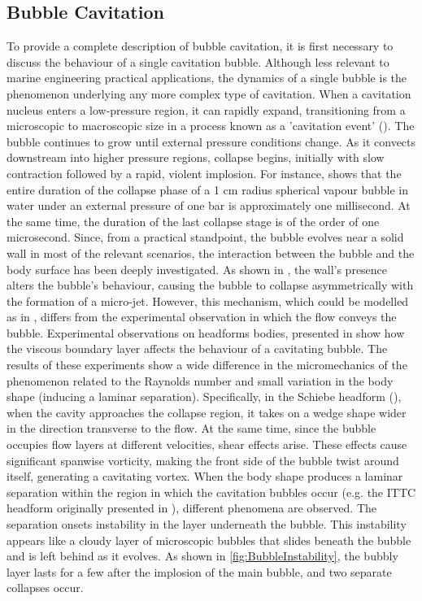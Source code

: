 \subsection{Bubble Cavitation}
To provide a complete description of bubble cavitation, it is first necessary to discuss the behaviour of a single cavitation bubble.
Although less relevant to marine engineering practical applications, the dynamics of a single bubble is the phenomenon underlying any more complex type of cavitation. 
When a cavitation nucleus enters a low-pressure region, it can rapidly expand, transitioning from a microscopic to macroscopic size in a process known as a 'cavitation event' (\cite{brennen2014cavitation}). The bubble continues to grow until external pressure conditions change. As it convects downstream into higher pressure regions, collapse begins, initially with slow contraction followed by a rapid, violent implosion.
For instance, \cite{franc2006fundamentals} shows that the entire duration of the collapse phase of a 1 cm radius spherical vapour bubble in water under an external pressure of one bar is approximately one millisecond. At the same time, the duration of the last collapse stage is of the order of one microsecond.
Since, from a practical standpoint, the bubble evolves near a solid wall in most of the relevant scenarios, the interaction between the bubble and the body surface has been deeply investigated.
As shown in \cite{franc2006fundamentals}, the wall's presence alters the bubble's behaviour, causing the bubble to collapse asymmetrically with the formation of a micro-jet.
However, this mechanism, which could be modelled as in \cite{Plesset_Chapman_1971}, differs from the experimental observation in which the flow conveys the bubble. 
Experimental observations on headforms bodies, presented in \cite{Ceccio_Brennen_1991} show how the viscous boundary layer affects the behaviour of a cavitating bubble. The results of these experiments show a wide difference in the micromechanics of the phenomenon related to the Raynolds number and small variation in the body shape (inducing a laminar separation).
Specifically, in the Schiebe headform (\cite{Schiebe1972MeasurementOT}), when the cavity approaches the collapse region, it takes on a wedge shape wider in the direction transverse to the flow. At the same time, since the bubble occupies flow layers at different velocities, shear effects arise. These effects cause significant spanwise vorticity, making the front side of the bubble twist around itself, generating a cavitating vortex.
When the body shape produces a laminar separation within the region in which the cavitation bubbles occur (e.g. the ITTC headform originally presented in \cite{Lindgren1966CavitationIO}), different phenomena are observed. The separation onsets instability in the layer underneath the bubble. This instability appears like a cloudy layer of microscopic bubbles that slides beneath the bubble and is left behind as it evolves. As shown in \ref{fig:BubbleInstability}, the bubbly layer lasts for a few after the implosion of the main bubble, and two separate collapses occur. 

